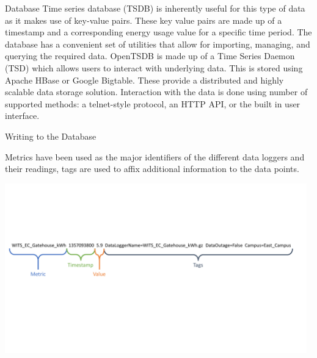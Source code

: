 \documentclass[8pt,xcolor={dvipsnames}]{beamer}
\begin{document}
{\begin{frame}{Database}
Time series database (TSDB) is inherently useful for this type of data as it makes use of key-value pairs. These key value pairs are made up of a timestamp and a corresponding energy usage value for a specific time period.
The database has a convenient set of utilities that allow for importing, managing, and querying the required data. OpenTSDB is made up of a Time Series Daemon (TSD) which allows users to interact with underlying data. This is stored using Apache HBase or Google Bigtable.
These provide a distributed and  highly scalable data storage solution.
Interaction with the data is done using number of supported methods: a telnet-style protocol, an HTTP API, or the built in user interface.


\begin{exampleblock}{Writing to the Database}
	
	\small Metrics have been used as the major identifiers of the different data loggers and their readings, tags are used to affix additional information to the data points.
	
	\begin{center}
		\includegraphics[width=0.98\textwidth, trim=13 210 15 180, clip]{WritingToTheDatabaseNotBold}
	\end{center}
\end{exampleblock}
	
	
	

\end{frame}

}
\end{document}
